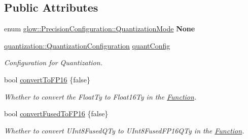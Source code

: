 \subsection*{Public Attributes}
\begin{DoxyCompactItemize}
\item 
\mbox{\label{structglow_1_1_precision_configuration_a51230123c34aaa8ea0720529aa3aa668}} 
enum \hyperlink{structglow_1_1_precision_configuration_a9a40e5e2126e4c6f3e8fe3bab25ff12c}{glow\+::\+Precision\+Configuration\+::\+Quantization\+Mode} {\bfseries None}
\item 
\mbox{\label{structglow_1_1_precision_configuration_a11d37f864d0732837579f9981da42fd6}} 
\hyperlink{structglow_1_1quantization_1_1_quantization_configuration}{quantization\+::\+Quantization\+Configuration} \hyperlink{structglow_1_1_precision_configuration_a11d37f864d0732837579f9981da42fd6}{quant\+Config}
\begin{DoxyCompactList}\small\item\em Configuration for Quantization. \end{DoxyCompactList}\item 
\mbox{\label{structglow_1_1_precision_configuration_ac9732333f585d5c8b6ecaf6855d12657}} 
bool \hyperlink{structglow_1_1_precision_configuration_ac9732333f585d5c8b6ecaf6855d12657}{convert\+To\+F\+P16} \{false\}
\begin{DoxyCompactList}\small\item\em Whether to convert the Float\+Ty to Float16\+Ty in the \hyperlink{classglow_1_1_function}{Function}. \end{DoxyCompactList}\item 
\mbox{\label{structglow_1_1_precision_configuration_abe4769c76864ecfd081d14b9854a744e}} 
bool \hyperlink{structglow_1_1_precision_configuration_abe4769c76864ecfd081d14b9854a744e}{convert\+Fused\+To\+F\+P16} \{false\}
\begin{DoxyCompactList}\small\item\em Whether to convert U\+Int8\+Fused\+Q\+Ty to U\+Int8\+Fused\+F\+P16\+Q\+Ty in the \hyperlink{classglow_1_1_function}{Function}. \end{DoxyCompactList}\item 

\end{DoxyCompactItemize}
